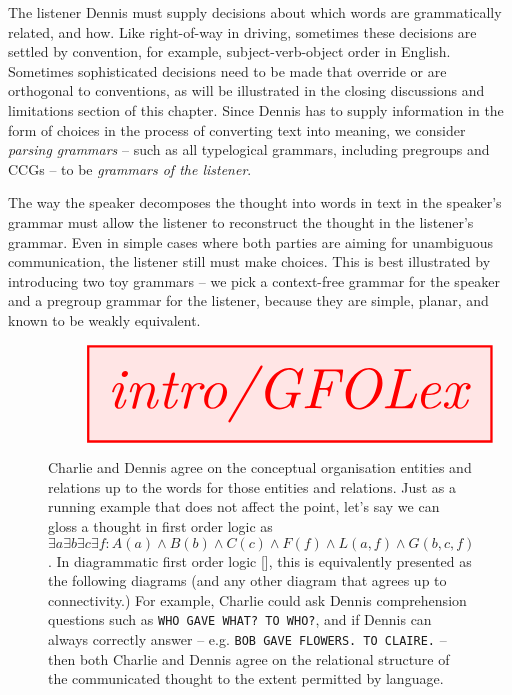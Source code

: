  The listener Dennis must supply decisions about which words are grammatically related, and how. Like right-of-way in driving, sometimes these decisions are settled by convention, for example, subject-verb-object order in English. Sometimes sophisticated decisions need to be made that override or are orthogonal to conventions, as will be illustrated in the closing discussions and limitations section of this chapter. Since Dennis has to supply information in the form of choices in the process of converting text into meaning, we consider \emph{parsing grammars} -- such as all typelogical grammars, including pregroups and CCGs -- to be \emph{grammars of the listener}.


 The way the speaker decomposes the thought into words in text in the speaker's grammar must allow the listener to reconstruct the thought in the listener's grammar. Even in simple cases where both parties are aiming for unambiguous communication, the listener still must make choices. This is best illustrated by introducing two toy grammars -- we pick a context-free grammar for the speaker and a pregroup grammar for the listener, because they are simple, planar, and known to be weakly equivalent.

\begin{figure}[h!]\label{fig:GFOLex}
\centering
\[\resizebox{\textwidth}{!}{\tikzfig{intro/GFOLex}}\]
\caption{Charlie and Dennis agree on the conceptual organisation entities and relations up to the words for those entities and relations. Just as a running example that does not affect the point, let's say we can gloss a thought in first order logic as $\exists a \exists b \exists c \exists f : A(a) \wedge B(b) \wedge C(c) \wedge F(f) \wedge L(a,f) \wedge G(b,c,f)$. In diagrammatic first order logic [], this is equivalently presented as the following diagrams (and any other diagram that agrees up to connectivity.) For example, Charlie could ask Dennis comprehension questions such as \texttt{WHO GAVE WHAT? TO WHO?}, and if Dennis can always correctly answer -- e.g. \texttt{BOB GAVE FLOWERS. TO CLAIRE.} -- then both Charlie and Dennis agree on the relational structure of the communicated thought to the extent permitted by language.}
\end{figure}

